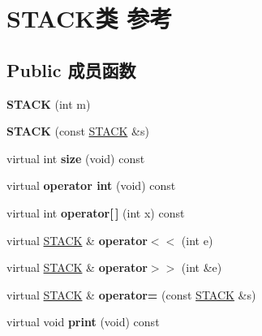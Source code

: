 \hypertarget{classSTACK}{}\section{S\+T\+A\+C\+K类 参考}
\label{classSTACK}
\subsection*{Public 成员函数}
\begin{DoxyCompactItemize}
\item 
{\bfseries S\+T\+A\+CK} (int m)\hypertarget{classSTACK_a05bc9d50ad557a3674c526a89e86e448}{}\label{classSTACK_a05bc9d50ad557a3674c526a89e86e448}

\item 
{\bfseries S\+T\+A\+CK} (const \hyperlink{classSTACK}{S\+T\+A\+CK} \&s)\hypertarget{classSTACK_a3378f08d7a0a6eda56e19cec7259e188}{}\label{classSTACK_a3378f08d7a0a6eda56e19cec7259e188}

\item 
virtual int {\bfseries size} (void) const \hypertarget{classSTACK_a2c64a2e35765b1120870e5bd768a6094}{}\label{classSTACK_a2c64a2e35765b1120870e5bd768a6094}

\item 
virtual {\bfseries operator int} (void) const \hypertarget{classSTACK_aefb6f31671a86cedb35642f718999655}{}\label{classSTACK_aefb6f31671a86cedb35642f718999655}

\item 
virtual int {\bfseries operator\mbox{[}$\,$\mbox{]}} (int x) const \hypertarget{classSTACK_af623ee48118d6b41b13e37d8d90d76ac}{}\label{classSTACK_af623ee48118d6b41b13e37d8d90d76ac}

\item 
virtual \hyperlink{classSTACK}{S\+T\+A\+CK} \& {\bfseries operator$<$$<$} (int e)\hypertarget{classSTACK_ae0163e70963b3dc5b585ebddfa145542}{}\label{classSTACK_ae0163e70963b3dc5b585ebddfa145542}

\item 
virtual \hyperlink{classSTACK}{S\+T\+A\+CK} \& {\bfseries operator$>$$>$} (int \&e)\hypertarget{classSTACK_a8581b5dd2195110a1baa0bc39b222db7}{}\label{classSTACK_a8581b5dd2195110a1baa0bc39b222db7}

\item 
virtual \hyperlink{classSTACK}{S\+T\+A\+CK} \& {\bfseries operator=} (const \hyperlink{classSTACK}{S\+T\+A\+CK} \&s)\hypertarget{classSTACK_af05d024de2a827a1812b2860bc86b65a}{}\label{classSTACK_af05d024de2a827a1812b2860bc86b65a}

\item 
virtual void {\bfseries print} (void) const \hypertarget{classSTACK_a7fbad0471b86e1572c19c91c11389e5f}{}\label{classSTACK_a7fbad0471b86e1572c19c91c11389e5f}

\end{DoxyCompactItemize}



